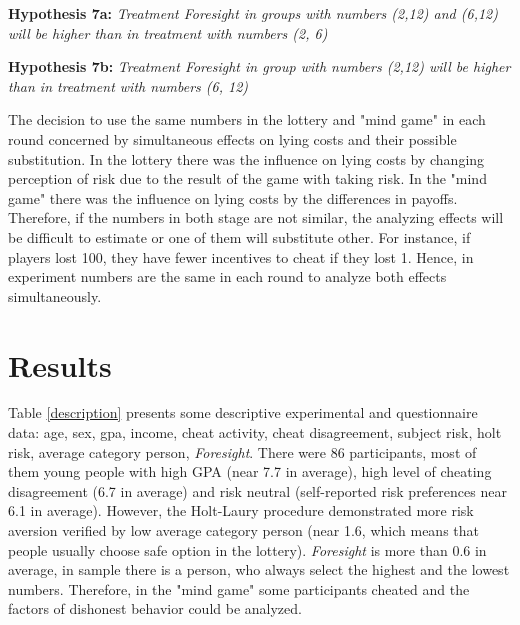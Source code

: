 \documentclass[12pt]{article}
\begin{document}
	\vspace{0.2cm}
	
	\textbf{Hypothesis 7a:}
	\textit{Treatment Foresight in groups with numbers (2,12) and (6,12) will be higher than in treatment with numbers (2, 6)}
	
	\textbf{Hypothesis 7b:}
	\textit{Treatment Foresight in group with numbers (2,12) will be higher than in treatment with numbers (6, 12)}

	\vspace{0.2cm}
	
	The decision to use the same numbers in the lottery and "mind game" in each round concerned by simultaneous effects on lying costs and their possible substitution. In the lottery there was the influence on lying costs by changing perception of risk due to the result of the game with taking risk. In the "mind game" there was the influence on lying costs by the differences in payoffs. Therefore, if the numbers in both stage are not similar, the analyzing effects will be difficult to estimate or one of them will substitute other. For instance, if players lost 100, they have fewer incentives to cheat if they lost 1. Hence, in experiment numbers are the same in each round to analyze both effects simultaneously.
	
	
	\section{Results}\label{results}
		
	Table \ref{description} presents some descriptive experimental and questionnaire data: age, sex, gpa, income, cheat activity, cheat disagreement, subject risk, holt risk, average category person, \textit{Foresight}. There were 86 participants, most of them young people with high GPA (near 7.7 in average), high level of cheating disagreement (6.7 in average) and risk neutral (self-reported risk preferences near 6.1 in average). However, the Holt-Laury procedure demonstrated more risk aversion verified by low average category person (near 1.6, which means that people usually choose safe option in the lottery). \textit{Foresight} is more than 0.6 in average, in sample there is a person, who always select the highest and the lowest numbers. Therefore, in the "mind game" some participants cheated and the factors of dishonest behavior could be analyzed.
	
\end{document}
